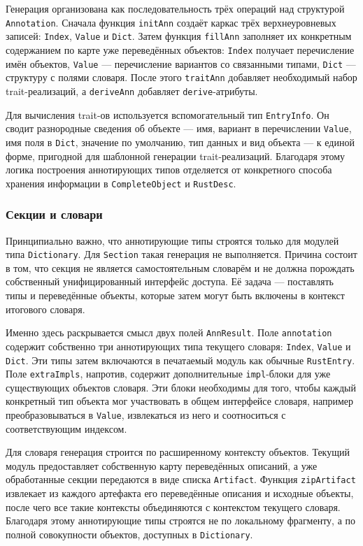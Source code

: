 \documentclass[a4paper,12pt]{article}
\begin{document}
Генерация организована как последовательность трёх операций над структурой
\texttt{Annotation}. Сначала функция \texttt{initAnn} создаёт каркас трёх верхнеуровневых
записей: \texttt{Index}, \texttt{Value} и \texttt{Dict}. Затем функция \texttt{fillAnn}
заполняет их конкретным содержанием по карте уже переведённых объектов: \texttt{Index}
получает перечисление имён объектов, \texttt{Value} --- перечисление вариантов со
связанными типами, \texttt{Dict} --- структуру с полями словаря. После этого
\texttt{traitAnn} добавляет необходимый набор trait-реализаций, а \texttt{deriveAnn}
добавляет \texttt{derive}-атрибуты.

Для вычисления trait-ов используется вспомогательный тип \texttt{EntryInfo}. Он
сводит разнородные сведения об объекте --- имя, вариант в перечислении \texttt{Value},
имя поля в \texttt{Dict}, значение по умолчанию, тип данных и вид объекта --- к единой
форме, пригодной для шаблонной генерации trait-реализаций. Благодаря этому логика
построения аннотирующих типов отделяется от конкретного способа хранения информации в
\texttt{CompleteObject} и \texttt{RustDesc}.

\subsubsection{Секции и словари}

Принципиально важно, что аннотирующие типы строятся только для модулей типа
\texttt{Dictionary}. Для \texttt{Section} такая генерация не выполняется. Причина состоит
в том, что секция не является самостоятельным словарём и не должна порождать собственный
унифицированный интерфейс доступа. Её задача --- поставлять типы и переведённые объекты,
которые затем могут быть включены в контекст итогового словаря.

Именно здесь раскрывается смысл двух полей \texttt{AnnResult}. Поле
\texttt{annotation} содержит собственно три аннотирующих типа текущего словаря:
\texttt{Index}, \texttt{Value} и \texttt{Dict}. Эти типы затем включаются в печатаемый
модуль как обычные \texttt{RustEntry}. Поле \texttt{extraImpls}, напротив, содержит
дополнительные \texttt{impl}-блоки для уже существующих объектов словаря. Эти блоки
необходимы для того, чтобы каждый конкретный тип объекта мог участвовать в общем
интерфейсе словаря, например преобразовываться в \texttt{Value}, извлекаться из него и
соотноситься с соответствующим индексом.

Для словаря генерация строится по расширенному контексту объектов. Текущий модуль
предоставляет собственную карту переведённых описаний, а уже обработанные секции
передаются в виде списка \texttt{Artifact}. Функция \texttt{zipArtifact} извлекает из
каждого артефакта его переведённые описания и исходные объекты, после чего все такие
контексты объединяются с контекстом текущего словаря. Благодаря этому аннотирующие типы
строятся не по локальному фрагменту, а по полной совокупности объектов, доступных в
\texttt{Dictionary}.
\end{document}
